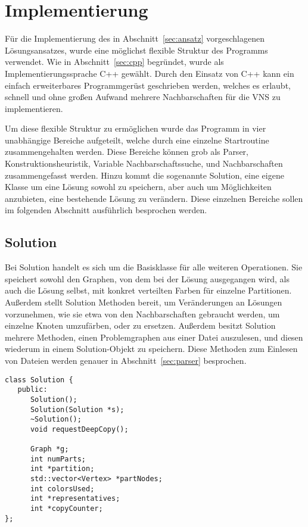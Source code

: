 \chapter{Implementierung}
Für die Implementierung des in Abschnitt~\ref{sec:ansatz} vorgeschlagenen Lösungsansatzes, wurde eine möglichst flexible Struktur des Programms verwendet. Wie in Abschnitt~\ref{sec:cpp} begründet, wurde
als Implementierungssprache C++ gewählt. Durch den Einsatz von C++ kann ein einfach erweiterbares Programmgerüst geschrieben werden, welches es erlaubt, schnell und ohne großen Aufwand mehrere Nachbarschaften
für die VNS zu implementieren. 

Um diese flexible Struktur zu ermöglichen wurde das Programm in vier unabhängige Bereiche aufgeteilt, welche durch eine einzelne Startroutine zusammengehalten werden. Diese Bereiche können grob als Parser, 
Konstruktionsheuristik, Variable Nachbarschaftssuche, und Nachbarschaften zusammengefasst werden. Hinzu kommt die sogenannte Solution, eine eigene Klasse um eine Lösung sowohl zu speichern, aber auch um Möglichkeiten
anzubieten, eine bestehende Lösung zu verändern. Diese einzelnen Bereiche sollen im folgenden Abschnitt ausführlich besprochen werden.

\section{Solution}
Bei Solution handelt es sich um die Basisklasse für alle weiteren Operationen. Sie speichert sowohl den Graphen, von dem bei der Lösung ausgegangen wird, als auch die Lösung selbst, mit konkret verteilten Farben
für einzelne Partitionen. Außerdem stellt Solution Methoden bereit, um Veränderungen an Lösungen vorzunehmen, wie sie etwa von den Nachbarschaften gebraucht werden, um einzelne Knoten umzufärben, oder zu ersetzen.
Außerdem besitzt Solution mehrere Methoden, einen Problemgraphen aus einer Datei auszulesen, und diesen wiederum in einem Solution-Objekt zu speichern. Diese Methoden zum Einlesen von Dateien werden genauer 
in Abschnitt~\ref{sec:parser} besprochen.

\singlespacing
\begin{lstlisting}[caption={Ein Ausschnitt aus der Signatur der Solutionklasse},label=lst:solution]
class Solution {
   public:
      Solution();
      Solution(Solution *s);
      ~Solution(); 
      void requestDeepCopy();

      Graph *g;
      int numParts;
      int *partition;
      std::vector<Vertex> *partNodes;
      int colorsUsed;
      int *representatives;
      int *copyCounter;
};
\end{lstlisting}

